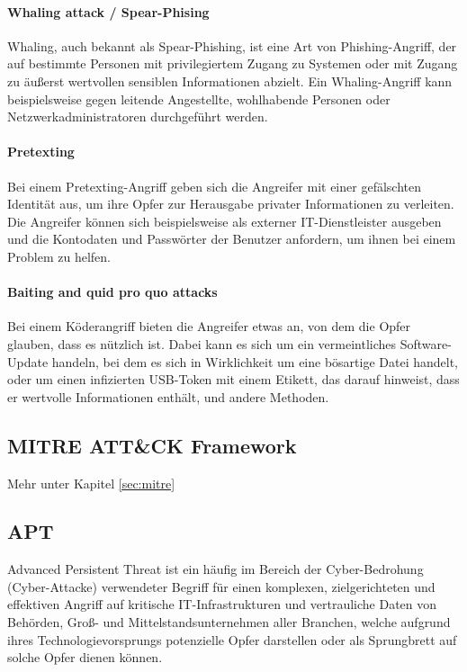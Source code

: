 \paragraph{Whaling attack / Spear-Phising}
Whaling, auch bekannt als Spear-Phishing, ist eine Art von Phishing-Angriff, der auf bestimmte Personen mit privilegiertem Zugang zu Systemen oder mit Zugang zu äußerst wertvollen sensiblen Informationen abzielt. Ein Whaling-Angriff kann beispielsweise gegen leitende Angestellte, wohlhabende Personen oder Netzwerkadministratoren durchgeführt werden.

\paragraph{Pretexting}
Bei einem Pretexting-Angriff geben sich die Angreifer mit einer gefälschten Identität aus, um ihre Opfer zur Herausgabe privater Informationen zu verleiten. Die Angreifer können sich beispielsweise als externer IT-Dienstleister ausgeben und die Kontodaten und Passwörter der Benutzer anfordern, um ihnen bei einem Problem zu helfen.

\paragraph{Baiting and quid pro quo attacks}
Bei einem Köderangriff bieten die Angreifer etwas an, von dem die Opfer glauben, dass es nützlich ist. Dabei kann es sich um ein vermeintliches Software-Update handeln, bei dem es sich in Wirklichkeit um eine bösartige Datei handelt, oder um einen infizierten USB-Token mit einem Etikett, das darauf hinweist, dass er wertvolle Informationen enthält, und andere Methoden.


\subsection{MITRE ATT\&CK Framework}
Mehr unter Kapitel \ref{sec:mitre}

\subsection{APT}
Advanced Persistent Threat ist ein häufig im Bereich der Cyber-Bedrohung (Cyber-Attacke) verwendeter Begriff für einen komplexen, zielgerichteten und effektiven Angriff auf kritische IT-Infrastrukturen und vertrauliche Daten von Behörden, Groß- und Mittelstandsunternehmen aller Branchen, welche aufgrund ihres Technologievorsprungs potenzielle Opfer darstellen oder als Sprungbrett auf solche Opfer dienen können.

